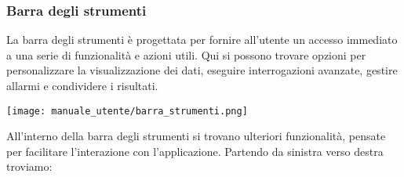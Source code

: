 \subsubsection{Barra degli strumenti}
La barra degli strumenti è progettata per fornire all'utente un accesso immediato a una serie di funzionalità e azioni utili. Qui si possono trovare opzioni per personalizzare la visualizzazione dei dati, eseguire interrogazioni avanzate, gestire allarmi e condividere i risultati.
\begin{center}
    \texttt{[image: manuale\_utente/barra\_strumenti.png]}
\end{center}
All'interno della barra degli strumenti si trovano ulteriori funzionalità, pensate per facilitare l'interazione con l'applicazione. Partendo da sinistra verso destra troviamo:
